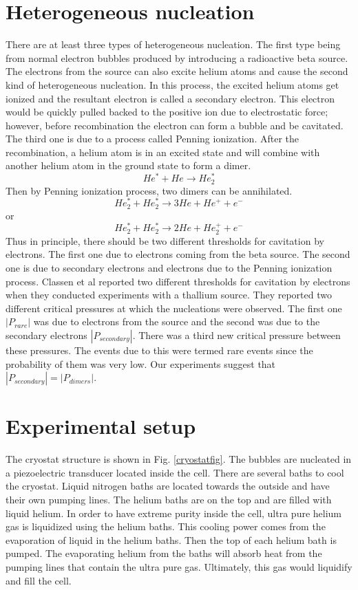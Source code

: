 \section{Heterogeneous nucleation}
There are at least three types of heterogeneous nucleation. The first type being from normal electron bubbles produced by introducing a radioactive beta source. The electrons from the source can also excite helium atoms and cause the second kind of heterogeneous nucleation. In this process, the excited helium atoms get ionized and the resultant electron is called a secondary electron. This electron would be quickly pulled backed to the positive ion due to electrostatic force; however, before recombination the electron can form a bubble and be cavitated. The third one is due to a process called Penning ionization. After the recombination, a helium atom is in an excited state and will combine with another helium atom in the ground state to form a dimer.
$$He^*+He\rightarrow He^*_2$$
Then by Penning ionization process, two dimers can be annihilated.
\begin{equation}\label{HeliumEq1}
He^*_2+He^*_2 \rightarrow 3He +He^+ + e^-
\end{equation}
or
\begin{equation}\label{HeliumEq2}
He^*_2+He^*_2 \rightarrow 2He + He^+_2 + e^-
\end{equation}
Thus in principle, there should be two different thresholds for cavitation by electrons. The first one due to electrons coming from the beta source. The second one is due to secondary electrons and electrons due to the Penning ionization process. Classen et al \cite{Classen} reported two different thresholds for cavitation by electrons when they conducted experiments with a thallium source. They reported two different critical pressures at which the nucleations were observed. The first one $|P_{rare}|$ was due to electrons from the source and the second was due to the secondary electrons $|P_{secondary}|$. There was a third new critical pressure between these pressures. The events due to this were termed rare events since the probability of them was very low. Our experiments suggest that $|P_{secondary}| = |P_{dimers}|$.
\section{Experimental setup}
The cryostat structure is shown in Fig. \ref{cryostatfig}. The bubbles are nucleated in a piezoelectric transducer located inside the cell. There are several baths to cool the cryostat. Liquid nitrogen baths are located towards the outside and have their own pumping lines. The helium baths are on the top and are filled with liquid helium. In order to have extreme purity inside the cell, ultra pure helium gas is liquidized using the helium baths. This cooling power comes from the evaporation of liquid in the helium baths. Then the top of each helium bath is pumped. The evaporating helium from the baths will absorb heat from the pumping lines that contain the ultra pure gas. Ultimately, this gas would liquidify and fill the cell. 

